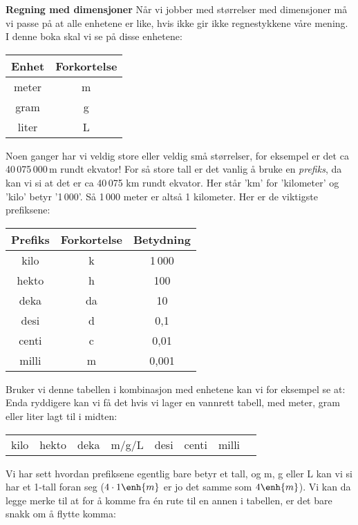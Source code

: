 \textbf{Regning med dimensjoner}\os
Når vi jobber med størrelser med dimensjoner må vi passe på at alle enhetene er like, hvis ikke gir ikke regnestykkene våre mening. I denne boka skal vi se på disse enhetene:
\tbs
\begin{center}
	\begin{tabular}{c|c}
		\textbf{Enhet} & \textbf{Forkortelse} \\ \hline
		meter & m \\\hline
		gram & g \\\hline
		liter & L
	\end{tabular}
\end{center}\tbs
Noen ganger har vi veldig store eller veldig små størrelser, for eksempel er det ca 40\,075\,000\,m rundt ekvator! For så store tall er det vanlig å bruke en \textit{prefiks}, da kan vi si at det er ca 40\,075 km rundt ekvator. Her står 'km' for 'kilometer' og 'kilo' betyr '1\,000'. Så 1\,000 meter er altså 1 kilometer. Her er de viktigste prefiksene:\tbs
\begin{center}
	\begin{tabular}{c|c|c}
		\textbf{Prefiks} & \textbf{Forkortelse}&\textbf{Betydning} \\ \hline
		kilo & k & 1\,000\\\hline
		hekto & h & 100\\\hline
		deka & da & 10\\\hline
		desi & d & 0,1\\\hline
		centi & c & 0,01\\\hline
		milli & m & 0,001\\\hline		
	\end{tabular}
\end{center}\tbs
Bruker vi denne tabellen i kombinasjon med enhetene kan vi for eksempel se at:\vs
{}
Enda ryddigere kan vi få det hvis vi lager en vannrett tabell, med meter, gram eller liter lagt til i midten:
\begin{center}
	\begin{tabular}{|c|c|c|c|c|c|c|c}
		kilo &
		hekto &
		deka & m/g/L &
		desi & 
		centi & 
		milli & 		
	\end{tabular}
\end{center}
Vi har sett hvordan prefiksene egentlig bare betyr et tall, og m, g eller L kan vi si har et 1-tall foran seg ($ {4\cdot1\enh{m}} $ er jo det samme som $ 4\enh{m} $). Vi kan da legge merke til at for å komme fra én rute til en annen i tabellen, er det bare snakk om å flytte komma:
